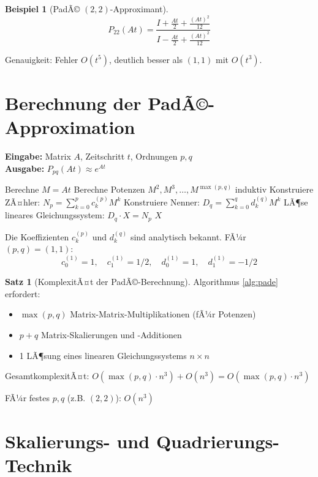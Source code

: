 ﻿\documentclass[a4paper,12pt]{report}
\theoremstyle{definition}
\newtheorem{beispiel}{Beispiel}
\newtheorem{satz}{Satz}
\begin{document}
	\begin{beispiel}[PadÃ© $(2,2)$-Approximant]
		\[
		P_{22}(At) = \frac{I + \frac{At}{2} + \frac{(At)^2}{12}}{I - \frac{At}{2} + \frac{(At)^2}{12}}
		\]
		
		Genauigkeit: Fehler $O(t^5)$, deutlich besser als $(1,1)$ mit $O(t^3)$.
	\end{beispiel}
	
	\section{Berechnung der PadÃ©-Approximation}
	
	\begin{algorithm}[H]
		\caption{PadÃ©-Approximation fÃ¼r Matrixexponential}
		\label{alg:pade}
		\textbf{Eingabe:} Matrix $A$, Zeitschritt $t$, Ordnungen $p, q$ \\
		\textbf{Ausgabe:} $P_{pq}(At) \approx e^{At}$
		\begin{algorithmic}[1]
			\State Berechne $M = At$
			\State Berechne Potenzen $M^2, M^3, \ldots, M^{\max(p,q)}$ induktiv
			\State Konstruiere ZÃ¤hler: $N_p = \sum_{k=0}^p c_k^{(p)} M^k$
			\State Konstruiere Nenner: $D_q = \sum_{k=0}^q d_k^{(q)} M^k$
			\State LÃ¶se lineares Gleichungssystem: $D_q \cdot X = N_p$
			\State \Return $X$
		\end{algorithmic}
	\end{algorithm}
	
	Die Koeffizienten $c_k^{(p)}$ und $d_k^{(q)}$ sind analytisch bekannt. FÃ¼r $(p,q) = (1,1)$:
	\[
	c_0^{(1)} = 1, \quad c_1^{(1)} = 1/2, \quad d_0^{(1)} = 1, \quad d_1^{(1)} = -1/2
	\]
	
	\begin{satz}[KomplexitÃ¤t der PadÃ©-Berechnung]
		Algorithmus \ref{alg:pade} erfordert:
		\begin{itemize}
			\item $\max(p,q)$ Matrix-Matrix-Multiplikationen (fÃ¼r Potenzen)
			\item $p + q$ Matrix-Skalierungen und -Additionen
			\item 1 LÃ¶sung eines linearen Gleichungssystems $n \times n$
		\end{itemize}
		
		GesamtkomplexitÃ¤t: $O(\max(p,q) \cdot n^3) + O(n^3) = O(\max(p,q) \cdot n^3)$
		
		FÃ¼r festes $p, q$ (z.B. $(2,2)$): $O(n^3)$
	\end{satz}
	
	\section{Skalierungs- und Quadrierungs-Technik}
	
\end{document}

